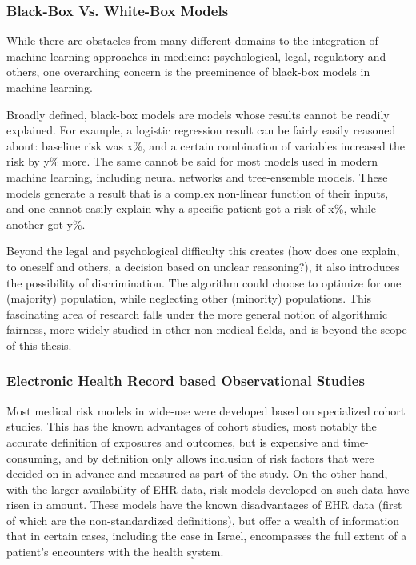 \documentclass[a4paper,12pt]{article}
\begin{document}
			\subsubsection{Black-Box Vs. White-Box Models}
			While there are obstacles from many different domains to the integration of machine learning approaches in medicine: psychological, legal, regulatory and others, one overarching concern is the preeminence of black-box models in machine learning\cite{Price2015}.
			
			Broadly defined, black-box models are models whose results cannot be readily explained. For example, a logistic regression result can be fairly easily reasoned about: baseline risk was x\%, and a certain combination of variables increased the risk by y\% more. The same cannot be said for most models used in modern machine learning, including neural networks and tree-ensemble models. These models generate a result that is a complex non-linear function of their inputs, and one cannot easily explain why a specific patient got a risk of x\%, while another got y\%.
			
			Beyond the legal and psychological difficulty this creates (how does one explain, to oneself and others, a decision based on unclear reasoning?), it also introduces the possibility of discrimination. The algorithm could choose to optimize for one (majority) population, while neglecting other (minority) populations\cite{Hebert-Johnson2017}. This fascinating area of research falls under the more general notion of algorithmic fairness, more widely studied in other non-medical fields\cite{Corbett-Davies2017}, and is beyond the scope of this thesis.
			
			\subsubsection{Electronic Health Record based Observational Studies}
		
			Most medical risk models in wide-use were developed based on specialized cohort studies\cite{Goldstein2016}. This has the known advantages of cohort studies, most notably the accurate definition of exposures and outcomes, but is expensive and time-consuming, and by definition only allows inclusion of risk factors that were decided on in advance and measured as part of the study. On the other hand, with the larger availability of EHR data, risk models developed on such data have risen in amount. These models have the known disadvantages of EHR data (first of which are the non-standardized definitions), but offer a wealth of information that in certain cases, including the case in Israel\cite{Lovis2015}, encompasses the full extent of a patient's encounters with the health system\cite{Goldstein2017}.
			
\end{document}
